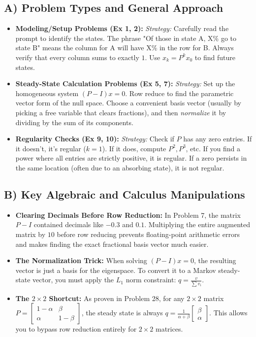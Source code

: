 \documentclass[11pt, letterpaper]{article}
\theoremstyle{definition}
\theoremstyle{remark}
\begin{document}
\subsection{A) Problem Types and General Approach}
\begin{itemize}
    \item \textbf{Modeling/Setup Problems (Ex 1, 2):} 
    \textit{Strategy:} Carefully read the prompt to identify the states. The phrase "Of those in state A, X\% go to state B" means the column for A will have X\% in the row for B. Always verify that every column sums to exactly $1$. Use $x_k = P^k x_0$ to find future states.
    \item \textbf{Steady-State Calculation Problems (Ex 5, 7):}
    \textit{Strategy:} Set up the homogeneous system $(P - I)x = 0$. Row reduce to find the parametric vector form of the null space. Choose a convenient basis vector (usually by picking a free variable that clears fractions), and then \textit{normalize} it by dividing by the sum of its components.
    \item \textbf{Regularity Checks (Ex 9, 10):}
    \textit{Strategy:} Check if $P$ has any zero entries. If it doesn't, it's regular ($k=1$). If it does, compute $P^2, P^3$, etc. If you find a power where all entries are strictly positive, it is regular. If a zero persists in the same location (often due to an absorbing state), it is not regular.
\end{itemize}

\subsection{B) Key Algebraic and Calculus Manipulations}
\begin{itemize}
    \item \textbf{Clearing Decimals Before Row Reduction:} In Problem 7, the matrix $P-I$ contained decimals like $-0.3$ and $0.1$. Multiplying the entire augmented matrix by $10$ before row reducing prevents floating-point arithmetic errors and makes finding the exact fractional basis vector much easier.
    \item \textbf{The Normalization Trick:} When solving $(P-I)x = 0$, the resulting vector is just a basis for the eigenspace. To convert it to a Markov steady-state vector, you must apply the $L_1$ norm constraint: $q = \frac{v}{\sum v_i}$.
    \item \textbf{The $2 \times 2$ Shortcut:} As proven in Problem 28, for any $2 \times 2$ matrix $P = \begin{bmatrix} 1-\alpha & \beta \\ \alpha & 1-\beta \end{bmatrix}$, the steady state is always $q = \frac{1}{\alpha+\beta}\begin{bmatrix} \beta \\ \alpha \end{bmatrix}$. This allows you to bypass row reduction entirely for $2 \times 2$ matrices.
\end{itemize}
\end{document}
